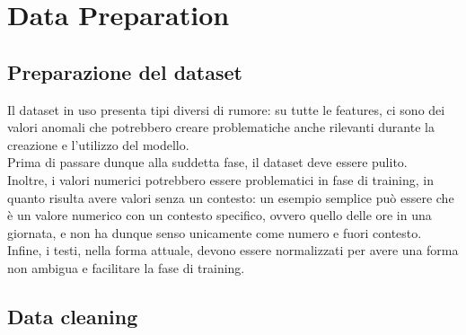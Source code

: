 \documentclass[a4paper,12pt]{report}
\begin{document}
\begingroup%
\makeatletter%
\let\clearpage\relax%
\vspace*{\fill}%
\vspace*{\dimexpr-50\p@-\baselineskip}%
\chapter{Data Preparation}
\vspace*{\fill}%
\endgroup
\newpage

\section{Preparazione del dataset}
Il dataset in uso presenta tipi diversi di rumore: su tutte le features, ci sono dei valori anomali che potrebbero creare problematiche anche rilevanti durante la creazione e l'utilizzo del modello.\\
Prima di passare dunque alla suddetta fase, il dataset deve essere pulito.\\
Inoltre, i valori numerici potrebbero essere problematici in fase di training, in quanto risulta avere valori senza un contesto: un esempio semplice può essere \texttt{\color{red}{upload\_hour}} che è un valore numerico con un contesto specifico, ovvero quello delle ore in una giornata, e non ha dunque senso unicamente come numero e fuori contesto.\\
Infine, i testi, nella forma attuale, devono essere normalizzati per avere una forma non ambigua e facilitare la fase di training.

\section{Data cleaning}
\end{document}
